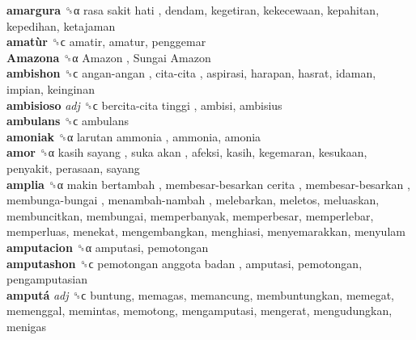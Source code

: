\textbf{amargura} ␝α   rasa sakit hati , dendam, kegetiran, kekecewaan, kepahitan, kepedihan, ketajaman  \\
\textbf{amatùr} ␝ϲ  amatir, amatur, penggemar  \\
\textbf{Amazona} ␝α   Amazon ,  Sungai Amazon   \\
\textbf{ambishon} ␝ϲ   angan-angan ,  cita-cita , aspirasi, harapan, hasrat, idaman, impian, keinginan  \\
\textbf{ambisioso} \emph{adj}  ␝ϲ   bercita-cita tinggi , ambisi, ambisius  \\
\textbf{ambulans} ␝ϲ  ambulans  \\
\textbf{amoniak} ␝α   larutan ammonia , ammonia, amonia  \\
\textbf{amor} ␝α   kasih sayang ,  suka akan , afeksi, kasih, kegemaran, kesukaan, penyakit, perasaan, sayang  \\
\textbf{amplia} ␝α   makin bertambah ,  membesar-besarkan cerita ,  membesar-besarkan ,  membunga-bungai ,  menambah-nambah , melebarkan, meletos, meluaskan, membuncitkan, membungai, memperbanyak, memperbesar, memperlebar, memperluas, menekat, mengembangkan, menghiasi, menyemarakkan, menyulam  \\
\textbf{amputacion} ␝α  amputasi, pemotongan  \\
\textbf{amputashon} ␝ϲ   pemotongan anggota badan , amputasi, pemotongan, pengamputasian  \\
\textbf{amputá} \emph{adj}  ␝ϲ  buntung, memagas, memancung, membuntungkan, memegat, memenggal, memintas, memotong, mengamputasi, mengerat, mengudungkan, menigas  \\
